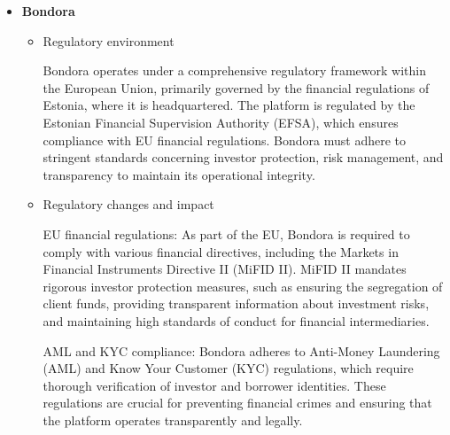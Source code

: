 \documentclass{article}
\begin{document}
\begin{itemize}
\begin{itemize}
        AML and KYC regulations: Mintos complies with Anti-Money Laundering (AML) and Know Your Customer (KYC) regulations, which require thorough verification of the identities of both borrowers and investors. These regulations are crucial for preventing financial crimes and ensuring that the platform operates transparently and legally.
        
        Risk management and reporting: Mintos is obligated to maintain comprehensive records and conduct regular reconciliations of investor funds. The platform is also subject to periodic audits by the FKTK to ensure compliance with all regulatory requirements. This robust oversight helps mitigate risks and maintain the integrity of the platform's operations.

    \end{itemize}


    \item \textbf{Bondora}
    \begin{itemize}
        \item Regulatory environment

        Bondora operates under a comprehensive regulatory framework within the European Union, primarily governed by the financial regulations of Estonia, where it is headquartered. The platform is regulated by the Estonian Financial Supervision Authority (EFSA), which ensures compliance with EU financial regulations. Bondora must adhere to stringent standards concerning investor protection, risk management, and transparency to maintain its operational integrity.
        
        \item Regulatory changes and impact

        EU financial regulations: As part of the EU, Bondora is required to comply with various financial directives, including the Markets in Financial Instruments Directive II (MiFID II). MiFID II mandates rigorous investor protection measures, such as ensuring the segregation of client funds, providing transparent information about investment risks, and maintaining high standards of conduct for financial intermediaries.
        
        AML and KYC compliance: Bondora adheres to Anti-Money Laundering (AML) and Know Your Customer (KYC) regulations, which require thorough verification of investor and borrower identities. These regulations are crucial for preventing financial crimes and ensuring that the platform operates transparently and legally.
        

\end{itemize}
\end{itemize}
\end{document}
